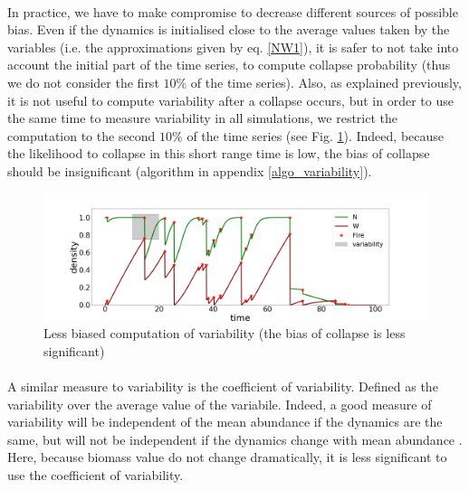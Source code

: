 \documentclass{article}
\begin{document}
\paragraph{}
In practice, we have to make compromise to decrease different sources of possible bias. Even if the dynamics is initialised close to the average values taken by the variables (i.e. the approximations given by eq. \ref{NW1}), it is safer to not take into account the initial part of the time series, to compute collapse probability (thus we do not consider the first $10\%$ of the time series). Also, as explained previously, it is not useful to compute variability after a collapse occurs, but in order to use the same time to measure variability in all simulations, we restrict the computation to the second $10\%$ of the time series (see Fig. \ref{fig:variability2}). Indeed, because the likelihood to collapse in this short range time is low, the bias of collapse should be insignificant (algorithm in appendix \ref{algo_variability}). %

\begin{figure}[h!]
\centering
\includegraphics[width=12.cm]{time_series_sd_2.png}
\caption{Less biased computation of variability (the bias of collapse is less significant)
\label{fig:variability2} 
}
\end{figure}


\paragraph{}
A similar measure to variability is the coefficient of variability. Defined as the variability over the average value of the variabile. Indeed, a good measure of variability will be independent of the mean abundance if the dynamics are the same, but will not be independent if the dynamics change with mean abundance \citep{gaston_measurement_1993, noauthor_temporal_1994}. Here, because biomass value do not change dramatically, it is less significant to use the coefficient of variability.
\end{document}
